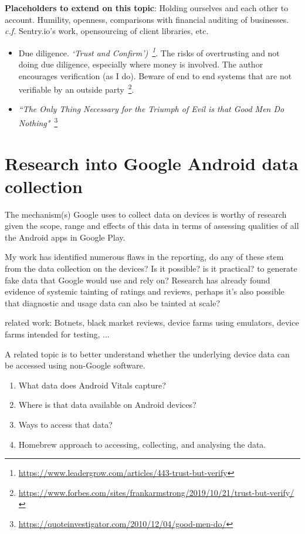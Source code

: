 \textbf{Placeholders to extend on this topic}: Holding ourselves and each other to account. Humility, openness, comparisons with financial auditing of businesses. \emph{c.f.} Sentry.io's work, opensourcing of client libraries, etc. 

\begin{itemize}
    \item Due diligence. \emph{`Trust and Confirm')~\footnote{\url{https://www.leadergrow.com/articles/443-trust-but-verify}}}. The risks of overtrusting and not doing due diligence, especially where money is involved. The author encourages verification (as I do). Beware of end to end systems that are not verifiable by an outside party~\footnote{\url{https://www.forbes.com/sites/frankarmstrong/2019/10/21/trust-but-verify/}}.
    \item \emph{``The Only Thing Necessary for the Triumph of Evil is that Good Men Do Nothing"}~\footnote{\url{https://quoteinvestigator.com/2010/12/04/good-men-do/}}
\end{itemize}

\section{Research into Google Android data collection}
The mechanism(s) Google uses to collect data on devices is worthy of research given the scope, range and effects of this data in terms of assessing qualities of all the Android apps in Google Play.

My work has identified numerous flaws in the reporting, do any of these stem from the data collection on the devices? Is it possible? is it practical? to generate fake data that Google would use and rely on? Research has already found evidence of systemic tainting of ratings and reviews, perhaps it's also possible that diagnostic and usage data can also be tainted at scale?

related work: Botnets, black market reviews, device farms using emulators, device farms intended for testing, ...

A related topic is to better understand whether the underlying device data can be accessed using non-Google software. 

\begin{enumerate}
    \item What data does Android Vitals capture?
    \item Where is that data available on Android devices?
    \item Ways to access that data?
    \item Homebrew approach to accessing, collecting, and analysing the data.
\end{enumerate}

